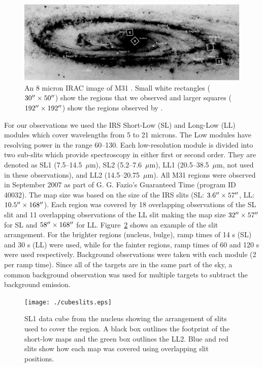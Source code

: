 \begin{figure}
\centering
\includegraphics[scale=0.9]{./m31_map.eps}
\caption{An 8 micron IRAC image of M31 \citep{Barmby2006lr}. Small white rectangles ($30\hbox{$^{\prime\prime}$}\times50\hbox{$^{\prime\prime}$}$) show the regions that we observed and larger squares ($192\hbox{$^{\prime\prime}$}\times192\hbox{$^{\prime\prime}$}$) show the regions observed by  \citet{1998Cesarsky}.
\label{m31}
}
\end{figure}


For our observations we used the IRS Short-Low (SL) and Long-Low (LL) modules which cover wavelengths from 5 to 21 microns. 
The Low modules have resolving power in the range 60--130. Each low-resolution module is divided into two sub-slits 
which provide spectroscopy in either first or second order. They are denoted as SL1 (7.5--14.5~$\mu$m), SL2 (5.2--7.6~$\mu$m),
LL1 (20.5--38.5~$\mu$m, not used in these observations), and LL2 (14.5--20.75~$\mu$m).
All M31 regions were observed in September 2007 as part of G. G. Fazio's Guaranteed Time (program ID 40032). 
The map size was based on the size 
of the IRS slits (SL: $3.6\hbox{$^{\prime\prime}$} \times 57\hbox{$^{\prime\prime}$}$, LL: $10.5\hbox{$^{\prime\prime}$} \times 168\hbox{$^{\prime\prime}$}$). Each region was covered by 18 overlapping observations 
of the SL slit and 11 overlapping observations of the LL slit making the map size $32\hbox{$^{\prime\prime}$} \times 57\hbox{$^{\prime\prime}$}$ for SL and $58\hbox{$^{\prime\prime}$} \times 168\hbox{$^{\prime\prime}$}$ for LL. 
Figure~\ref{slits} shows an example of the slit arrangement. For the brighter regions (nucleus, bulge), ramp times of 14 s (SL) and 30 s (LL) were used, 
while for the fainter regions, ramp times of 60 and 120 s were used respectively. Background observations were taken with each module (2 per ramp time). 
Since all of the targets are in the same part of the sky, a common background observation was used for multiple targets to subtract the background emission. 

\begin{figure}
\centering
\texttt{[image: ./cubeslits.eps]}
\caption{SL1 data cube from the nucleus showing the arrangement of slits used to cover the region. 
A black box outlines the footprint of the short-low maps and the green box outlines the LL2. Blue and red slits show how 
each map was covered using overlapping slit positions.
\label{slits}
}
\end{figure}

